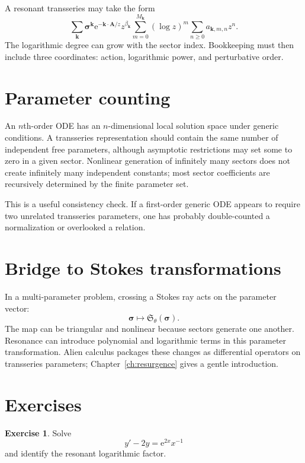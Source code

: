 \documentclass[11pt,openany]{book}
\theoremstyle{definition}
\newtheorem{exercise}{Exercise}[chapter]
\theoremstyle{plain}
\theoremstyle{remark}
\newcommand{\e}{\mathrm{e}}
\newcommand{\Stokes}{\mathfrak{S}}
\begin{document}
A resonant transseries may take the form
\begin{equation}\label{eq:log-sector-template}
 \sum_{\mathbf k}
 \boldsymbol\sigma^{\mathbf k}\e^{-\mathbf k\cdot\mathbf A/z}
 z^{\beta_{\mathbf k}}
 \sum_{m=0}^{M_{\mathbf k}}(\log z)^m
 \sum_{n\ge0}a_{\mathbf k,m,n}z^n.
\end{equation}
The logarithmic degree can grow with the sector index. Bookkeeping must then include three coordinates: action, logarithmic power, and perturbative order.

\section{Parameter counting}

An $n$th-order ODE has an $n$-dimensional local solution space under generic conditions. A transseries representation should contain the same number of independent free parameters, although asymptotic restrictions may set some to zero in a given sector. Nonlinear generation of infinitely many sectors does not create infinitely many independent constants; most sector coefficients are recursively determined by the finite parameter set.

This is a useful consistency check. If a first-order generic ODE appears to require two unrelated transseries parameters, one has probably double-counted a normalization or overlooked a relation.

\section{Bridge to Stokes transformations}

In a multi-parameter problem, crossing a Stokes ray acts on the parameter vector:
\[
 \boldsymbol\sigma
 \longmapsto
 \Stokes_{\theta}(\boldsymbol\sigma).
\]
The map can be triangular and nonlinear because sectors generate one another. Resonance can introduce polynomial and logarithmic terms in this parameter transformation. Alien calculus packages these changes as differential operators on transseries parameters; Chapter~\ref{ch:resurgence} gives a gentle introduction.

\section{Exercises}

\begin{exercise}
Solve
\[
 y'-2y=\e^{2x}x^{-1}
\]
and identify the resonant logarithmic factor.
\end{exercise}
\end{document}
